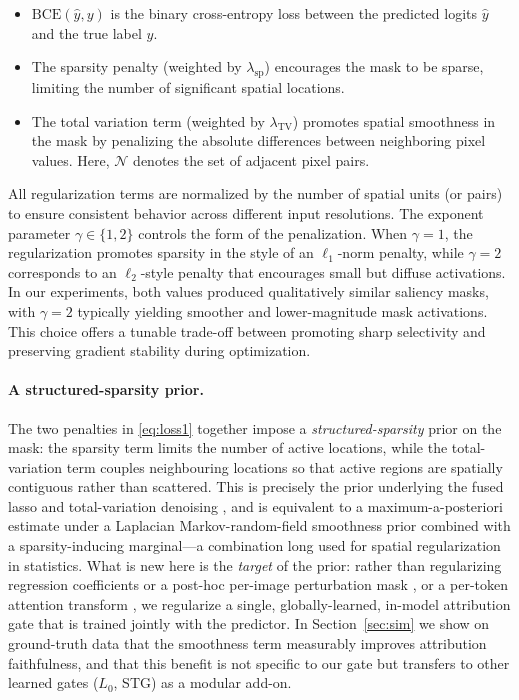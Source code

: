 \documentclass[12pt]{article}
\begin{document}
\begin{itemize}
    \item \( \mathrm{BCE}(\hat{y}, y) \) is the binary cross-entropy loss between the predicted logits \( \hat{y} \) and the true label \( y \).
    \item The sparsity penalty (weighted by \( \lambda_{\text{sp}} \)) encourages the mask to be sparse, limiting the number of significant spatial locations.
    \item The total variation term (weighted by \( \lambda_{\text{TV}} \)) promotes spatial smoothness in the mask by penalizing the absolute differences between neighboring pixel values. Here, \( \mathcal{N} \) denotes the set of adjacent pixel pairs.
\end{itemize}

All regularization terms are normalized by the number of spatial units (or pairs) to ensure consistent behavior across different input resolutions. The exponent parameter \( \gamma \in \{1, 2\} \) controls the form of the penalization. When \( \gamma = 1 \), the regularization promotes sparsity in the style of an \( \ell_1 \)-norm penalty, while \( \gamma = 2 \) corresponds to an \( \ell_2 \)-style penalty that encourages small but diffuse activations. In our experiments, both values produced qualitatively similar saliency masks, with \( \gamma = 2 \) typically yielding smoother and lower-magnitude mask activations. This choice offers a tunable trade-off between promoting sharp selectivity and preserving gradient stability during optimization.

\paragraph{A structured-sparsity prior.}
The two penalties in \eqref{eq:loss1} together impose a \emph{structured-sparsity} prior on the mask: the sparsity term limits the number of active locations, while the total-variation term couples neighbouring locations so that active regions are spatially contiguous rather than scattered. This is precisely the prior underlying the fused lasso \citep{Tibshirani2005FusedLasso} and total-variation denoising \citep{ROF1992}, and is equivalent to a maximum-a-posteriori estimate under a Laplacian Markov-random-field smoothness prior combined with a sparsity-inducing marginal---a combination long used for spatial regularization in statistics. What is new here is the \emph{target} of the prior: rather than regularizing regression coefficients or a post-hoc per-image perturbation mask \citep{Fong2017MeaningfulPerturbation,Dabkowski2017RealTime}, or a per-token attention transform \citep{Martins2020TVMax}, we regularize a single, globally-learned, in-model attribution gate that is trained jointly with the predictor. In Section~\ref{sec:sim} we show on ground-truth data that the smoothness term measurably improves attribution faithfulness, and that this benefit is not specific to our gate but transfers to other learned gates ($L_0$, STG) as a modular add-on.
\end{document}
